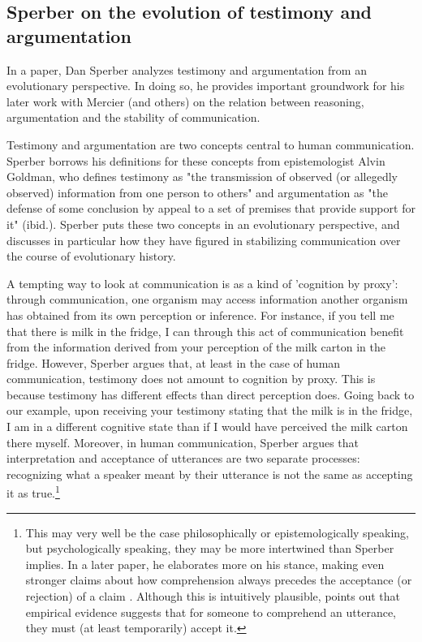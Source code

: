 \subsection{Sperber on the evolution of testimony and argumentation}
\label{sec:Sperber01}

In a \citeyear{Sperber01} paper, Dan Sperber analyzes testimony and argumentation from an evolutionary perspective. In doing so, he provides important groundwork for his later work with Mercier (and others) on the relation between reasoning, argumentation and the stability of communication.

Testimony and argumentation are two concepts central to human communication. Sperber borrows his definitions for these concepts from epistemologist Alvin Goldman, who defines testimony as "the transmission of observed (or allegedly observed) information from one person to others" \citep[p.~401]{Sperber01} and argumentation as "the defense of some conclusion by appeal to a set of premises that provide support for it" (ibid.).
Sperber puts these two concepts in an evolutionary perspective, and discusses in particular how they have figured in stabilizing communication over the course of evolutionary history.

A tempting way to look at communication is as a kind of 'cognition by proxy': through communication, one organism may access information another organism has obtained from its own perception or inference. For instance, if you tell me that there is milk in the fridge, I can through this act of communication benefit from the information derived from your perception of the milk carton in the fridge.
However, Sperber argues that, at least in the case of human communication, testimony does not amount to cognition by proxy. This is because testimony has different effects than direct perception does. Going back to our example, upon receiving your testimony stating that the milk is in the fridge, I am in a different cognitive state than if I would have perceived the milk carton there myself. Moreover, in human communication, Sperber argues that interpretation and acceptance of utterances are two separate processes: recognizing what a speaker meant by their utterance is not the same as accepting it as true.\footnote{This may very well be the case philosophically or epistemologically speaking, but psychologically speaking, they may be more intertwined than Sperber implies. In a later paper, he elaborates more on his stance, making even stronger claims about how comprehension always precedes the acceptance (or rejection) of a claim \citep[\S 3]{Sperber10}. Although this is intuitively plausible, \citet{Lewandowsky12} points out that empirical evidence suggests that for someone to comprehend an utterance, they must (at least temporarily) accept it.}

